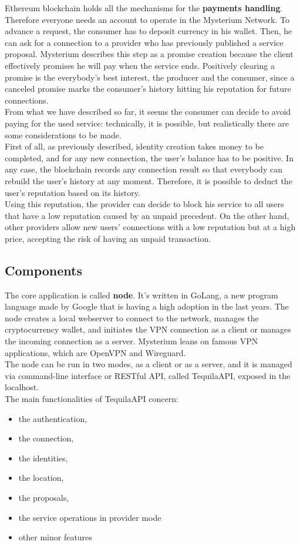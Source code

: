\documentclass[]{article}
\begin{document}
	Ethereum blockchain holds all the mechanisms for the \textbf{payments handling}. Therefore everyone needs an account to operate in the Mysterium Network. To advance a request, the consumer has to deposit currency in his wallet. Then, he can ask for a connection to a provider who has previously published a service proposal. Mysterium describes this step as a promise creation because the client effectively promises he will pay when the service ends. Positively clearing a promise is the everybody's best interest, the producer and the consumer, since a canceled promise marks the consumer's history hitting his reputation for future connections.\\
	From what we have described so far, it seems the consumer can decide to avoid paying for the used service: technically, it is possible, but realistically there are some considerations to be made.\\
	First of all, as previously described, identity creation takes money to be completed, and for any new connection, the user's balance has to be positive. In any case, the blockchain records any connection result so that everybody can rebuild the user's history at any moment. Therefore, it is possible to deduct the user's reputation based on its history.\\
	Using this reputation, the provider can decide to block his service to all users that have a low reputation caused by an unpaid precedent. On the other hand, other providers allow new users' connections with a low reputation but at a high price, accepting the risk of having an unpaid transaction.\\
	
	\subsection{Components}

	The core application is called \textbf{node}. It's written in GoLang, a new program language made by Google that is having a high adoption in the last years. The node creates a local webserver to connect to the network, manages the cryptocurrency wallet, and initiates the VPN connection as a client or manages the incoming connection as a server. Mysterium leans on famous VPN applications, which are OpenVPN and Wireguard.\\
	The node can be run in two modes, as a client or as a server, and it is managed via command-line interface or RESTful API, called TequilaAPI, exposed in the localhost.\\
	The main functionalities of TequilaAPI concern:
	\begin{itemize}
		\item the authentication,
		\item the connection,
		\item the identities,
		\item the location,
		\item the proposals,
		\item the service operations in provider mode
		\item other minor features
	\end{itemize}
		
\end{document}
